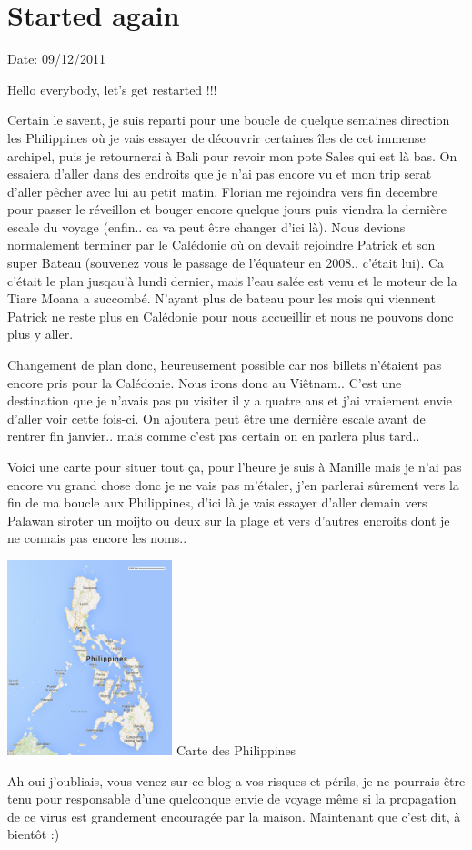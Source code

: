 \section{Started again}

Date: 09/12/2011

\begin{multicols}{2}

Hello everybody, let's get restarted !!!

Certain le savent, je suis reparti pour une boucle de quelque semaines direction les Philippines où je vais essayer de découvrir certaines îles de cet immense archipel, puis je retournerai à Bali pour revoir mon pote Sales qui est là bas. On essaiera d'aller dans des endroits que je n'ai pas encore vu et mon trip serat d'aller pêcher avec lui au petit matin. Florian me rejoindra vers fin decembre pour passer le réveillon et bouger encore quelque jours puis viendra la dernière escale du voyage (enfin.. ca va peut être changer d'ici là). Nous devions normalement terminer par le Calédonie où on devait rejoindre Patrick et son super Bateau (souvenez vous le passage de l'équateur en 2008.. c'était lui). Ca c'était le plan jusqau'à lundi dernier, mais l'eau salée est venu et le moteur de la Tiare Moana a succombé. N'ayant plus de bateau pour les mois qui viennent Patrick ne reste plus en Calédonie pour nous accueillir et nous ne pouvons donc plus y aller.

Changement de plan donc, heureusement possible car nos billets n'étaient pas encore pris pour la Calédonie. Nous irons donc au Viêtnam.. C'est une destination que je n'avais pas pu visiter il y a quatre ans et j'ai vraiement envie d'aller voir cette fois-ci. On ajoutera peut être une dernière escale avant de rentrer fin janvier.. mais comme c'est pas certain on en parlera plus tard..

Voici une carte pour situer tout ça, pour l'heure je suis à Manille mais je n'ai pas encore vu grand chose donc je ne vais pas m'étaler, j'en parlerai sûrement vers la fin de ma boucle aux Philippines, d'ici là je vais essayer d'aller demain vers Palawan siroter un moijto ou deux sur la plage et vers d'autres encroits dont je ne connais pas encore les noms..

\hspace*{-0.65cm}
\includegraphics[width=4.8cm]{articles/Started-again/philippines.png}
Carte des Philippines

Ah oui j'oubliais, vous venez sur ce blog a vos risques et périls, je ne pourrais être tenu pour responsable d'une quelconque envie de voyage même si la propagation de ce virus est grandement encouragée par la maison. Maintenant que c'est dit, à bientôt :)

\end{multicols}
